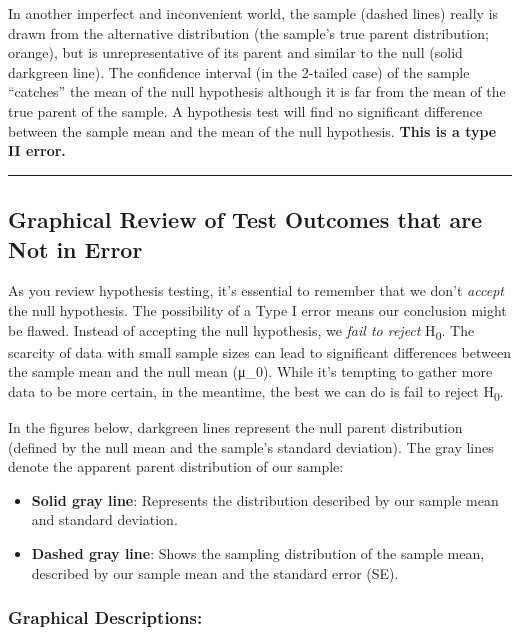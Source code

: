 \documentclass[
  letterpaper,
  DIV=11,
  numbers=noendperiod]{scrartcl}
\begin{document}
In another imperfect and inconvenient world, the sample (dashed lines)
really is drawn from the alternative distribution (the sample's true
parent distribution; orange), but is unrepresentative of its parent and
similar to the null (solid darkgreen line). The confidence interval (in
the 2-tailed case) of the sample ``catches'' the mean of the null
hypothesis although it is far from the mean of the true parent of the
sample. A hypothesis test will find no significant difference between
the sample mean and the mean of the null hypothesis. \textbf{This is a
type II error.}

\begin{center}\rule{0.5\linewidth}{0.5pt}\end{center}

\hypertarget{graphical-review-of-test-outcomes-that-are-not-in-error}{%
\subsection{Graphical Review of Test Outcomes that are Not in
Error}\label{graphical-review-of-test-outcomes-that-are-not-in-error}}

As you review hypothesis testing, it's essential to remember that we
don't \emph{accept} the null hypothesis. The possibility of a Type I
error means our conclusion might be flawed. Instead of accepting the
null hypothesis, we \emph{fail to reject} H\textsubscript{0}. The
scarcity of data with small sample sizes can lead to significant
differences between the sample mean and the null mean (μ\_0). While it's
tempting to gather more data to be more certain, in the meantime, the
best we can do is fail to reject H\textsubscript{0}.

In the figures below, darkgreen lines represent the null parent
distribution (defined by the null mean and the sample's standard
deviation). The gray lines denote the apparent parent distribution of
our sample:

\begin{itemize}
\item
  \textbf{Solid gray line}: Represents the distribution described by our
  sample mean and standard deviation.
\item
  \textbf{Dashed gray line}: Shows the sampling distribution of the
  sample mean, described by our sample mean and the standard error (SE).
\end{itemize}

\hypertarget{graphical-descriptions}{%
\subsubsection{Graphical Descriptions:}\label{graphical-descriptions}}
\end{document}
